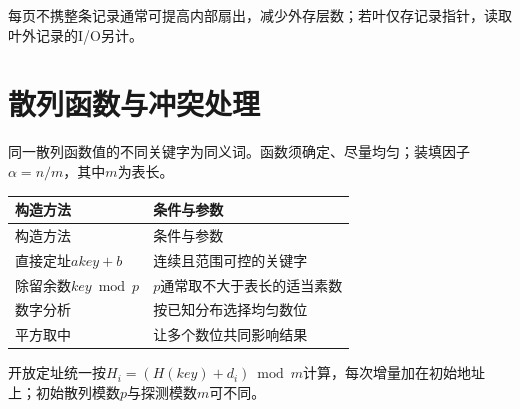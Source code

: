 每页不携整条记录通常可提高内部扇出，减少外存层数；若叶仅存记录指针，读取叶外记录的I/O另计。

\section{散列函数与冲突处理}\label{DS07-hash}

同一散列函数值的不同关键字为同义词。函数须确定、尽量均匀；装填因子\(\alpha=n/m\)，其中\(m\)为表长。

\par\smallskip
{\fontsize{9.3}{12}\selectfont\setlength{\tabcolsep}{2.5pt}\setlength{\LTleft}{0pt}\setlength{\LTright}{0pt}
\begin{longtable}{@{}>{\raggedright\arraybackslash}p{}>{\raggedright\arraybackslash}p{}@{}}
\toprule
构造方法 & 条件与参数 \\

\midrule\endfirsthead\toprule
构造方法 & 条件与参数 \\

\midrule\endhead\bottomrule\endfoot
直接定址\(akey+b\) & 连续且范围可控的关键字 \\

除留余数\(key\bmod p\) & \(p\)通常取不大于表长的适当素数 \\

数字分析 & 按已知分布选择均匀数位 \\

平方取中 & 让多个数位共同影响结果 \\

\end{longtable}}
\par\smallskip

开放定址统一按\(H_i=(H(key)+d_i)\bmod m\)计算，每次增量加在初始地址上；初始散列模数\(p\)与探测模数\(m\)可不同。

